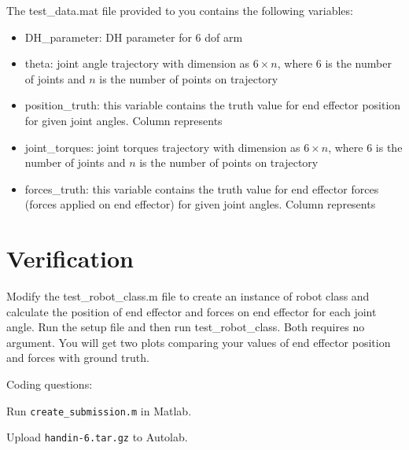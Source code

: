 \documentclass{/home/puneet/Desktop/courses/16384/Assignments/16384_doc}
\begin{document}
The test\_data.mat file provided to you contains the following variables:
\begin{itemize}
\item DH\_parameter: DH parameter for 6 dof arm
\item theta: joint angle trajectory with dimension as $6\times n$, where 6 is the number of joints and $n$ is the number of points on trajectory
\item position\_truth: this variable contains the truth value for end effector position for given joint angles. Column represents 
\item joint\_torques:  joint torques trajectory with dimension as $6\times n$, where 6 is the number of joints and $n$ is the number of points on trajectory
\item forces\_truth: this variable contains the truth value for end effector forces (forces applied on end effector) for given joint angles. Column represents 
\end{itemize}


\section{Verification}
Modify the test\_robot\_class.m file to create an instance of robot class and calculate the position of end effector  and forces on end effector  for each joint angle. Run the setup file and then run test\_robot\_class. Both requires no argument. You will get two plots comparing your values of end effector position and forces with ground truth. 

\begin{submissionChecklist}
		\item Coding questions:
    	\begin{checklist}
        	\item Run \verb!create_submission.m! in Matlab.
        	\item Upload \verb!handin-6.tar.gz! to Autolab.
    	\end{checklist}
	\end{submissionChecklist}
\end{document}
